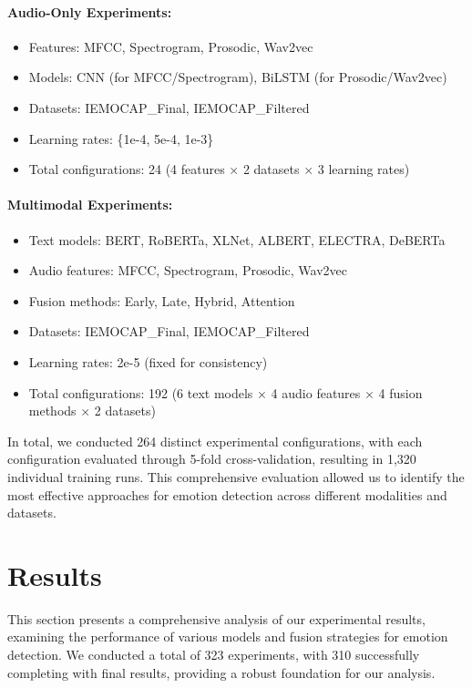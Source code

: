 \documentclass[12pt]{article}
\begin{document}
\paragraph{Audio-Only Experiments:}
\begin{itemize}
    \item Features: MFCC, Spectrogram, Prosodic, Wav2vec
    \item Models: CNN (for MFCC/Spectrogram), BiLSTM (for Prosodic/Wav2vec)
    \item Datasets: IEMOCAP\_Final, IEMOCAP\_Filtered
    \item Learning rates: \{1e-4, 5e-4, 1e-3\}
    \item Total configurations: 24 (4 features × 2 datasets × 3 learning rates)
\end{itemize}

\paragraph{Multimodal Experiments:}
\begin{itemize}
    \item Text models: BERT, RoBERTa, XLNet, ALBERT, ELECTRA, DeBERTa
    \item Audio features: MFCC, Spectrogram, Prosodic, Wav2vec
    \item Fusion methods: Early, Late, Hybrid, Attention
    \item Datasets: IEMOCAP\_Final, IEMOCAP\_Filtered
    \item Learning rates: 2e-5 (fixed for consistency)
    \item Total configurations: 192 (6 text models × 4 audio features × 4 fusion methods × 2 datasets)
\end{itemize}

In total, we conducted 264 distinct experimental configurations, with each configuration evaluated through 5-fold cross-validation, resulting in 1,320 individual training runs. This comprehensive evaluation allowed us to identify the most effective approaches for emotion detection across different modalities and datasets.

\section{Results}
\label{sec:results}

This section presents a comprehensive analysis of our experimental results, examining the performance of various models and fusion strategies for emotion detection. We conducted a total of 323 experiments, with 310 successfully completing with final results, providing a robust foundation for our analysis.
\end{document}
